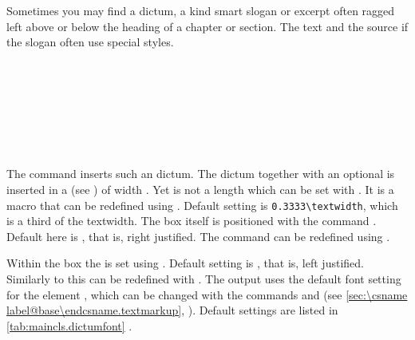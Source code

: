 Sometimes you may find a dictum, a kind smart slogan or excerpt often ragged
left above or below the heading of a chapter or section. The text and the
source if the slogan often use special styles.


\begin{Declaration}
  \\
  \\
  \\
  \\
  \\
  \\
\end{Declaration}%
%
%
%
%
%
%
%
The command  inserts such an dictum.
%
The dictum together with an optional  is inserted in a
 (see \cite{latex:usrguide}) of width
. Yet  is not a length which can be set
with . It is a macro that can be redefined using
. Default setting is \verb;0.3333\textwidth;, which is a
third of the textwidth. The box itself is positioned with the command
. Default here is ,
that is, right justified.  The command  can be redefined
using .

Within the box the  is set using .
Default setting is , that is, left
justified. Similarly to  this can be redefined with
.  The output uses the default font setting for the
element , which can be changed with the commands
 and  (see \autoref{sec:\csname
  label@base\endcsname.textmarkup}, ). Default settings are listed in
\autoref{tab:maincls.dictumfont}%
%
.

